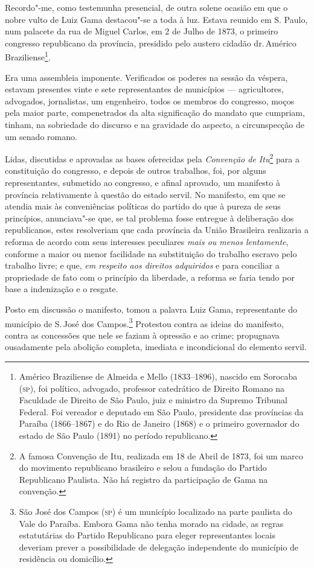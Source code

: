 Recordo"-me, como testemunha presencial, de outra solene ocasião em que o
nobre vulto de Luiz Gama destacou"-se a toda à luz. Estava reunido em S.
Paulo, num palacete da rua de Miguel Carlos, em 2 de Julho de 1873, o
primeiro congresso republicano da província, presidido pelo austero
cidadão dr.\,Américo Braziliense\footnote{Américo Braziliense de
  Almeida e Mello (1833--1896), nascido em Sorocaba (\textsc{sp}), foi político,
  advogado, professor catedrático de Direito Romano na Faculdade de
  Direito de São Paulo, juiz e ministro da Supremo Tribunal Federal. Foi
  vereador e deputado em São Paulo, presidente das províncias da Paraíba
  (1866--1867) e do Rio de Janeiro (1868) e o primeiro governador do
  estado de São Paulo (1891) no período republicano.}.

Era uma assembleia imponente. Verificados os poderes na sessão da
véspera, estavam presentes vinte e sete representantes de municípios
--- agricultores, advogados, jornalistas, um engenheiro, todos os
membros do congresso, moços pela maior parte, compenetrados da alta
significação do mandato que cumpriam, tinham, na sobriedade do discurso
e na gravidade do aspecto, a circunspecção de um senado romano.

Lidas, discutidas e aprovadas as bases oferecidas pela \emph{Convenção
de Itu}\footnote{A famosa Convenção de Itu, realizada em 18 de Abril
  de 1873, foi um marco do movimento republicano brasileiro e selou a
  fundação do Partido Republicano Paulista. Não há registro da
  participação de Gama na convenção.} para a constituição do congresso,
e depois de outros trabalhos, foi, por alguns representantes, submetido
ao congresso, e afinal aprovado, um manifesto à província relativamente
à questão do estado servil. No manifesto, em que se atendia mais às
conveniências políticas do partido do que à pureza de seus princípios,
anunciava"-se que, se tal problema fosse entregue à deliberação dos
republicanos, estes resolveriam que cada província da União Brasileira
realizaria a reforma de acordo com seus interesses peculiares \emph{mais
ou menos lentamente}, conforme a maior ou menor facilidade na
substituição do trabalho escravo pelo trabalho livre; e que, \emph{em
respeito aos direitos adquiridos} e para conciliar a propriedade de fato
com o princípio da liberdade, a reforma se faria tendo por base a
indenização e o resgate.

Posto em discussão o manifesto, tomou a palavra Luiz Gama, representante
do município de S.\,José dos Campos.\footnote{São José dos Campos (\textsc{sp})
  é um município localizado na parte paulista do Vale do Paraíba. Embora
  Gama não tenha morado na cidade, as regras estatutárias do Partido
  Republicano para eleger representantes locais deveriam prever a
  possibilidade de delegação independente do município de residência ou
  domicílio.} Protestou contra as ideias do manifesto, contra as
concessões que nele se faziam à opressão e ao crime; propugnava
ousadamente pela abolição completa, imediata e incondicional do elemento
servil.

